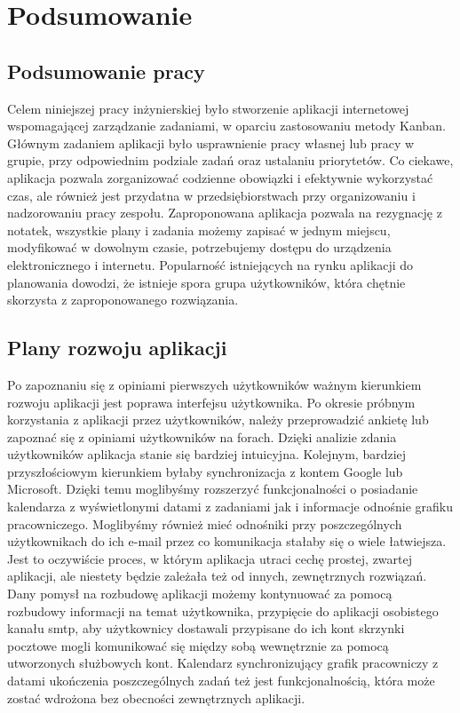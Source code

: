 \chapter{Podsumowanie}

\section{Podsumowanie pracy}
\thispagestyle{chapterBeginStyle}

Celem niniejszej pracy inżynierskiej było stworzenie aplikacji internetowej wspomagającej zarządzanie zadaniami, w oparciu zastosowaniu metody Kanban.  Głównym zadaniem aplikacji było usprawnienie pracy własnej lub pracy w grupie, przy odpowiednim podziale zadań oraz ustalaniu priorytetów. Co ciekawe, aplikacja pozwala zorganizować codzienne obowiązki i efektywnie wykorzystać czas, ale również jest przydatna w przedsiębiorstwach przy organizowaniu i nadzorowaniu pracy zespołu. Zaproponowana aplikacja pozwala na rezygnację z notatek, wszystkie plany i zadania możemy zapisać w jednym miejscu, modyfikować w dowolnym czasie, potrzebujemy dostępu do urządzenia elektronicznego i internetu. Popularność istniejących na rynku aplikacji do planowania dowodzi, że istnieje spora grupa użytkowników, która chętnie skorzysta z zaproponowanego rozwiązania. 

\section{Plany rozwoju aplikacji}
Po zapoznaniu się z opiniami pierwszych użytkowników ważnym kierunkiem rozwoju aplikacji jest poprawa interfejsu użytkownika. Po okresie próbnym korzystania z aplikacji przez użytkowników, należy przeprowadzić ankietę lub zapoznać się z opiniami użytkowników na forach. Dzięki analizie zdania użytkowników aplikacja stanie się bardziej intuicyjna.
Kolejnym, bardziej przyszłościowym kierunkiem byłaby synchronizacja z kontem Google lub Microsoft. Dzięki temu moglibyśmy rozszerzyć funkcjonalności o posiadanie kalendarza z wyświetlonymi datami z zadaniami jak i informacje odnośnie grafiku pracowniczego. Moglibyśmy również mieć odnośniki przy poszczególnych użytkownikach do ich e-mail przez co komunikacja stałaby się o wiele łatwiejsza.  Jest to oczywiście proces, w którym aplikacja utraci cechę prostej, zwartej aplikacji, ale niestety będzie zależała też od innych, zewnętrznych rozwiązań. Dany pomysł na rozbudowę aplikacji możemy kontynuować za pomocą rozbudowy informacji na temat użytkownika, przypięcie do aplikacji osobistego kanału smtp, aby użytkownicy dostawali przypisane do ich kont skrzynki pocztowe mogli komunikować się między sobą wewnętrznie za pomocą utworzonych służbowych kont. Kalendarz synchronizujący grafik pracowniczy z datami ukończenia poszczególnych zadań też jest funkcjonalnością, która może zostać wdrożona bez obecności zewnętrznych aplikacji.

